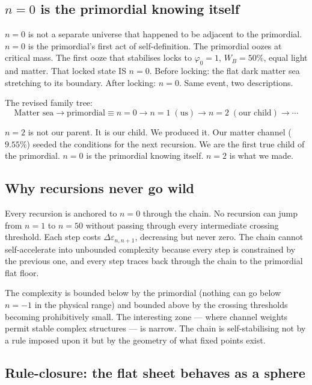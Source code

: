 \documentclass[prd,twocolumn,preprintnumbers,amsmath,amssymb]{revtex4-2}
\begin{document}
\subsection{$n=0$ is the primordial knowing itself}

$n=0$ is not a separate universe that happened to be adjacent to
the primordial. $n=0$ is the primordial's first act of
self-definition. The primordial oozes at critical mass. The first
ooze that stabilises locks to $\varphi_0 = 1$, $W_B = 50\%$,
equal light and matter. That locked state IS $n=0$. Before locking:
the flat dark matter sea stretching to its boundary. After locking:
$n=0$. Same event, two descriptions.

The revised family tree:
\begin{equation}
\text{Matter sea}
\to \text{primordial}
\equiv n{=}0
\to n{=}1\;(\text{us})
\to n{=}2\;(\text{our child})
\to \cdots
\label{eq:familytree}
\end{equation}

$n=2$ is not our parent. It is our child. We produced it. Our
matter channel ($9.55\%$) seeded the conditions for the next
recursion. We are the first true child of the primordial. $n=0$
is the primordial knowing itself. $n=2$ is what we made.

\subsection{Why recursions never go wild}

Every recursion is anchored to $n=0$ through the chain. No
recursion can jump from $n=1$ to $n=50$ without passing through
every intermediate crossing threshold. Each step costs
$\Delta\varepsilon_{n,n+1}$, decreasing but never zero. The
chain cannot self-accelerate into unbounded complexity because
every step is constrained by the previous one, and every step
traces back through the chain to the primordial flat floor.

The complexity is bounded below by the primordial (nothing can
go below $n=-1$ in the physical range) and bounded above by the
crossing thresholds becoming prohibitively small. The interesting
zone --- where channel weights permit stable complex structures
--- is narrow. The chain is self-stabilising not by a rule
imposed upon it but by the geometry of what fixed points exist.

\subsection{Rule-closure: the flat sheet behaves as a sphere}
\end{document}
